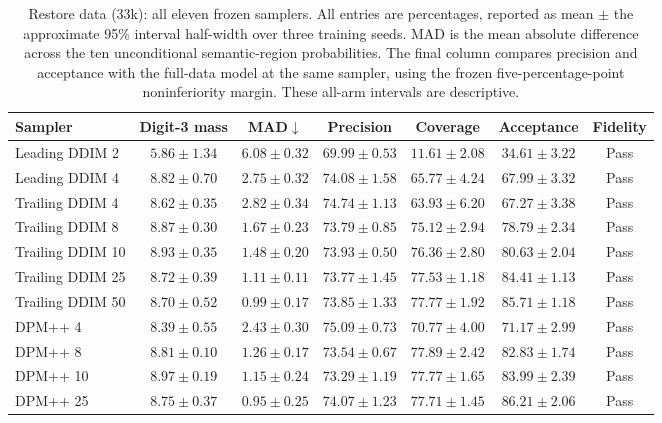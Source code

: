 \begin{table}[t]
\centering\footnotesize
\setlength{\tabcolsep}{3.5pt}
\caption{Restore data (33k): all eleven frozen samplers. All entries are percentages, reported as mean $\pm$ the approximate 95\% interval half-width over three training seeds. MAD is the mean absolute difference across the ten unconditional semantic-region probabilities. The final column compares precision and acceptance with the full-data model at the same sampler, using the frozen five-percentage-point noninferiority margin. These all-arm intervals are descriptive.}
\label{tab:mnist_all_restore_data}
\begin{tabular}{lcccccc}
\toprule
Sampler & Digit-3 mass & MAD$\downarrow$ & Precision & Coverage & Acceptance & Fidelity \\
\midrule
Leading DDIM 2 & $5.86\pm1.34$ & $6.08\pm0.32$ & $69.99\pm0.53$ & $11.61\pm2.08$ & $34.61\pm3.22$ & Pass \\
Leading DDIM 4 & $8.82\pm0.70$ & $2.75\pm0.32$ & $74.08\pm1.58$ & $65.77\pm4.24$ & $67.99\pm3.32$ & Pass \\
Trailing DDIM 4 & $8.62\pm0.35$ & $2.82\pm0.34$ & $74.74\pm1.13$ & $63.93\pm6.20$ & $67.27\pm3.38$ & Pass \\
Trailing DDIM 8 & $8.87\pm0.30$ & $1.67\pm0.23$ & $73.79\pm0.85$ & $75.12\pm2.94$ & $78.79\pm2.34$ & Pass \\
Trailing DDIM 10 & $8.93\pm0.35$ & $1.48\pm0.20$ & $73.93\pm0.50$ & $76.36\pm2.80$ & $80.63\pm2.04$ & Pass \\
Trailing DDIM 25 & $8.72\pm0.39$ & $1.11\pm0.11$ & $73.77\pm1.45$ & $77.53\pm1.18$ & $84.41\pm1.13$ & Pass \\
Trailing DDIM 50 & $8.70\pm0.52$ & $0.99\pm0.17$ & $73.85\pm1.33$ & $77.77\pm1.92$ & $85.71\pm1.18$ & Pass \\
DPM++ 4 & $8.39\pm0.55$ & $2.43\pm0.30$ & $75.09\pm0.73$ & $70.77\pm4.00$ & $71.17\pm2.99$ & Pass \\
DPM++ 8 & $8.81\pm0.10$ & $1.26\pm0.17$ & $73.54\pm0.67$ & $77.89\pm2.42$ & $82.83\pm1.74$ & Pass \\
DPM++ 10 & $8.97\pm0.19$ & $1.15\pm0.24$ & $73.29\pm1.19$ & $77.77\pm1.65$ & $83.99\pm2.39$ & Pass \\
DPM++ 25 & $8.75\pm0.37$ & $0.95\pm0.25$ & $74.07\pm1.23$ & $77.71\pm1.45$ & $86.21\pm2.06$ & Pass \\
\bottomrule
\end{tabular}
\end{table}

